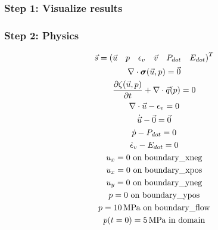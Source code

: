 \documentclass[aspectratio=169]{beamer}
\begin{document}
\begin{frame}
  \frametitle{Step 1: Visualize results}

    
\end{frame}


\begin{frame}
  \frametitle{Step 2: Physics}
  \summary{}

  \begin{minipage}{0.35\textwidth}
    {\scriptsize
      \begin{gather*}
        \vec{s} = \left(\vec{u} \quad p \quad \epsilon_v \quad \vec{v} \quad P_{dot} \quad E_{dot}\right)^T \\
        \nabla \cdot \boldsymbol{\sigma}(\vec{u},p) = \vec{0} \\
        \frac{\partial \zeta(\vec{u},p)}{\partial t} + \nabla \cdot \vec{q}(p) = 0 \\
        \nabla \cdot \vec{u} - \epsilon_{v} = 0 \\
        \dot{\vec{u}} - \vec{0} = \vec{0} \\
        \dot{p} - P_{dot} = 0 \\
        \dot{\epsilon}_{v} - E_{dot} = 0 \\
        u_x = 0 \text{ on boundary\_xneg} \\
        u_x = 0 \text{ on boundary\_xpos} \\
        u_y = 0 \text{ on boundary\_yneg} \\
        p = 0 \text{ on boundary\_ypos} \\
        p = 10 \text{\,MPa on boundary\_flow} \\
        p(t=0) = 5 \text{\,MPa  in domain}
    \end{gather*}}
  \end{minipage}
  \hfill
  \begin{minipage}{0.55\textwidth}
  \end{minipage}
      
\end{frame}
\end{document}
